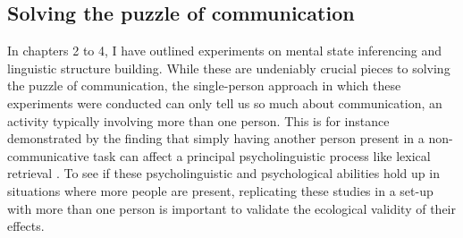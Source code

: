 \subsection*{Solving the puzzle of communication}

In chapters 2 to 4, I have outlined experiments on mental state inferencing and linguistic structure building. While these are undeniably crucial pieces to solving the puzzle of communication, the single-person approach in which these experiments were conducted can only tell us so much about communication, an activity typically involving more than one person. This is for instance demonstrated by the finding that simply having another person present in a non-communicative task can affect a principal psycholinguistic process like lexical retrieval \citep{kuhlen2017having}. To see if these psycholinguistic and psychological abilities hold up in situations where more people are present, replicating these studies in a set-up with more than one person is important to validate the ecological validity of their effects.

